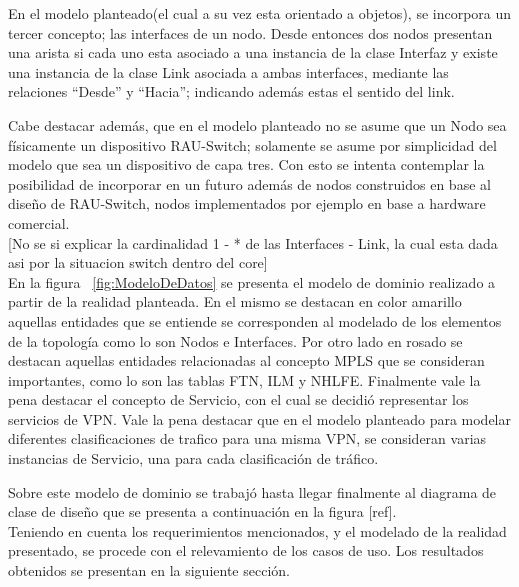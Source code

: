 En el modelo planteado(el cual a su vez esta orientado a objetos), se incorpora un tercer concepto;  las interfaces de un nodo. Desde entonces dos nodos presentan una arista si cada uno esta asociado a una instancia de la clase Interfaz y existe una instancia de la clase Link asociada a ambas interfaces, mediante las relaciones “Desde” y “Hacia”; indicando adem\'as estas el sentido del link.

Cabe destacar adem\'as, que en el modelo planteado no se asume que un Nodo sea f\'isicamente un dispositivo RAU-Switch; solamente se asume por simplicidad del modelo que sea un dispositivo de capa tres. Con esto se intenta contemplar la posibilidad de incorporar en un futuro adem\'as de nodos construidos en base al diseño de RAU-Switch, nodos implementados por ejemplo en base a hardware comercial.\\
  
[No se si explicar la cardinalidad 1 - * de las Interfaces - Link, la cual esta dada asi por la situacion switch dentro del core]\\

En la figura ~\ref{fig:ModeloDeDatos} se presenta el modelo de dominio realizado a partir de la realidad planteada. En el mismo se destacan en color amarillo aquellas entidades que se entiende se corresponden al modelado de los elementos de la topolog\'ia como lo son Nodos e Interfaces. Por otro lado en rosado se destacan aquellas entidades relacionadas al concepto MPLS que se consideran importantes, como lo son las tablas FTN, ILM y NHLFE. Finalmente vale la pena destacar el concepto de Servicio, con el cual se decidi\'o representar los servicios de VPN. Vale la pena destacar que en el modelo planteado para modelar diferentes clasificaciones de trafico para una misma VPN, se consideran varias instancias de Servicio, una para cada clasificación de tr\'afico. 



Sobre este modelo de dominio se trabaj\'o hasta llegar finalmente al diagrama de clase de dise\~no que se presenta a continuaci\'on en la figura [ref].\\

Teniendo en cuenta los requerimientos mencionados, y el modelado de la realidad presentado, se procede con el relevamiento de los casos de uso. Los resultados obtenidos se presentan en la siguiente secci\'on.

